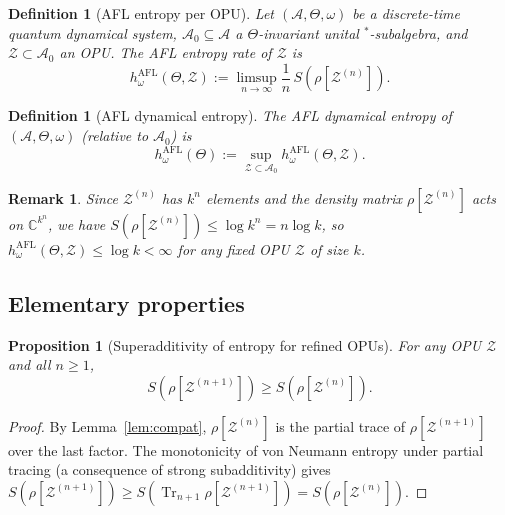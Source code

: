 \documentclass[12pt,a4paper]{article}
\newtheorem{proposition}[theorem]{Proposition}
\newtheorem{definition}[theorem]{Definition}
\newtheorem{remark}[theorem]{Remark}
\DeclareMathOperator{\Tr}{Tr}
\newcommand{\A}{\mathcal{A}}
\begin{document}
\begin{definition}[AFL entropy per OPU]\label{def:AFL_OPU}
Let $(\A,\Theta,\omega)$ be a discrete-time quantum dynamical system,
$\A_0\subseteq\A$ a $\Theta$-invariant unital $^*$-subalgebra, and
$\mathcal{Z}\subset\A_0$ an OPU.  The \emph{AFL entropy rate} of $\mathcal{Z}$
is
\begin{equation}\label{eq:AFL_OPU}
  h_\omega^{\mathrm{AFL}}(\Theta,\mathcal{Z})
  := \limsup_{n\to\infty}\frac{1}{n}\,S\!\left(\rho[\mathcal{Z}^{(n)}]\right).
\end{equation}
\end{definition}

\begin{definition}[AFL dynamical entropy]\label{def:AFL}
The \emph{AFL dynamical entropy} of $(\A,\Theta,\omega)$ (relative to $\A_0$)
is
\begin{equation}\label{eq:AFL}
  h_\omega^{\mathrm{AFL}}(\Theta)
  := \sup_{\mathcal{Z}\subset\A_0}
     h_\omega^{\mathrm{AFL}}(\Theta,\mathcal{Z}).
\end{equation}
\end{definition}

\begin{remark}
Since $\mathcal{Z}^{(n)}$ has $k^n$ elements and the density matrix
$\rho[\mathcal{Z}^{(n)}]$ acts on $\mathbb{C}^{k^n}$, we have
$S(\rho[\mathcal{Z}^{(n)}])\leq\log k^n = n\log k$, so
$h_\omega^{\mathrm{AFL}}(\Theta,\mathcal{Z})\leq\log k < \infty$ for any
fixed OPU $\mathcal{Z}$ of size $k$.
\end{remark}

\subsection{Elementary properties}

\begin{proposition}[Superadditivity of entropy for refined OPUs]
\label{prop:super}
For any OPU $\mathcal{Z}$ and all $n\geq 1$,
\begin{equation}\label{eq:super}
  S\!\left(\rho[\mathcal{Z}^{(n+1)}]\right)
  \geq S\!\left(\rho[\mathcal{Z}^{(n)}]\right).
\end{equation}
\end{proposition}
\begin{proof}
By Lemma~\ref{lem:compat}, $\rho[\mathcal{Z}^{(n)}]$ is the partial trace of
$\rho[\mathcal{Z}^{(n+1)}]$ over the last factor.  The monotonicity of von
Neumann entropy under partial tracing (a consequence of strong subadditivity)
gives $S(\rho[\mathcal{Z}^{(n+1)}])\geq S(\Tr_{n+1}\rho[\mathcal{Z}^{(n+1)}])
=S(\rho[\mathcal{Z}^{(n)}])$.
\end{proof}
\end{document}
